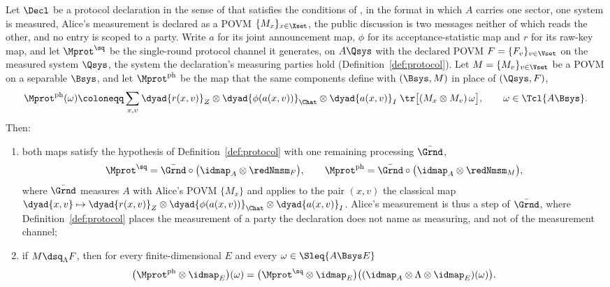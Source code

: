\begin{proposition}\label{prop:platform}
Let $\Decl$ be a protocol declaration in the sense of
 that satisfies the conditions of
, in the format in which $A$ carries one sector, one
system is measured, Alice's measurement is declared as a POVM
$\{M_x\}_{x\in\Xset}$, the public discussion is two messages neither of which
reads the other, and no entry is scoped to a party. Write $a$ for its joint
announcement map, $\phi$ for its acceptance-statistic map and $r$ for its
raw-key map, and let $\Mprot^{\sq}$ be the single-round protocol channel it
generates, on $A\Qsys$ with the declared POVM $F=\{F_v\}_{v\in\Vset}$ on the
measured system $\Qsys$, the system the declaration's measuring parties hold
(Definition~\ref{def:protocol}). Let $M=\{M_v\}_{v\in\Vset}$ be a POVM on a
separable $\Bsys$, and let $\Mprot^{\mathrm{ph}}$ be the map that the same
components define with $(\Bsys,M)$ in place of $(\Qsys,F)$,
\begin{equation}\label{eq:platformph}
  \Mprot^{\mathrm{ph}}(\omega)\coloneqq\sum_{x,v}
  \dyad{r(x,v)}_{Z}\otimes\dyad{\phi(a(x,v))}_{\Chat}\otimes
  \dyad{a(x,v)}_{I}\;\tr\big[(M_x\otimes M_v)\,\omega\big],
  \qquad\omega\in\Tcl{A\Bsys}.
\end{equation}
Then:
\begin{enumerate}[label=(\roman*),leftmargin=3.0em]
\item both maps satisfy the hypothesis of Definition~\ref{def:protocol} with
  one remaining processing $\bar{\Grnd}$,
  \begin{equation*}
    \Mprot^{\sq}=\bar{\Grnd}\circ\big(\idmap_A\otimes\redNmsm_F\big),
    \qquad
    \Mprot^{\mathrm{ph}}=\bar{\Grnd}\circ\big(\idmap_A\otimes\redNmsm_M\big),
  \end{equation*}
  where $\bar{\Grnd}$ measures $A$ with Alice's POVM $\{M_x\}$ and applies to
  the pair $(x,v)$ the classical map $\dyad{x,v}\mapsto
  \dyad{r(x,v)}_{Z}\otimes\dyad{\phi(a(x,v))}_{\Chat}\otimes\dyad{a(x,v)}_{I}$.
  Alice's measurement is thus a step of $\bar{\Grnd}$, where
  Definition~\ref{def:protocol} places the measurement of a party the
  declaration does not name as measuring, and not of the measurement channel;
\item if $M\dsq_{\Lambda}F$, then for every finite-dimensional $E$ and every
  $\omega\in\Sleq{A\Bsys E}$
  \begin{equation}\label{eq:platformfact}
    \big(\Mprot^{\mathrm{ph}}\otimes\idmap_E\big)(\omega)
    =\big(\Mprot^{\sq}\otimes\idmap_E\big)
     \big((\idmap_A\otimes\Lambda\otimes\idmap_E)(\omega)\big).
  \end{equation}
\end{enumerate}
\end{proposition}

